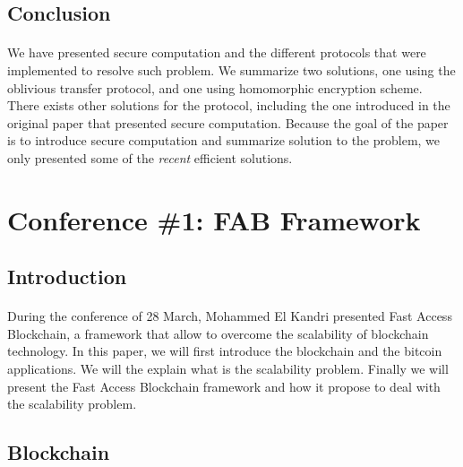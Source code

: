\documentclass[11pt,a4paper]{article}
\begin{document}
\subsection{Conclusion}

\paragraph{}


We have presented secure computation and the different protocols
that were implemented to resolve such problem. We summarize two solutions,
one using the oblivious transfer protocol, and one using
homomorphic encryption scheme. There exists other solutions for
the protocol, including the one introduced in the original paper
\cite{yao_protocols_1982}
that presented secure computation. Because the goal
of the paper is to introduce secure computation and summarize
solution to the problem, we only presented some of the \textit{recent}
efficient solutions.

\newpage

\section{Conference \#1: FAB Framework}

\subsection{Introduction}

\paragraph{}


During the conference of 28 March, Mohammed El Kandri presented
Fast Access Blockchain, a framework that allow to overcome
the scalability of blockchain technology. In this paper, we
will first introduce the blockchain and the bitcoin applications.
We will the explain what is the scalability problem. Finally
we will present the Fast Access Blockchain framework and how
it propose to deal with the scalability problem.

\subsection{Blockchain}

\paragraph{}
\end{document}
